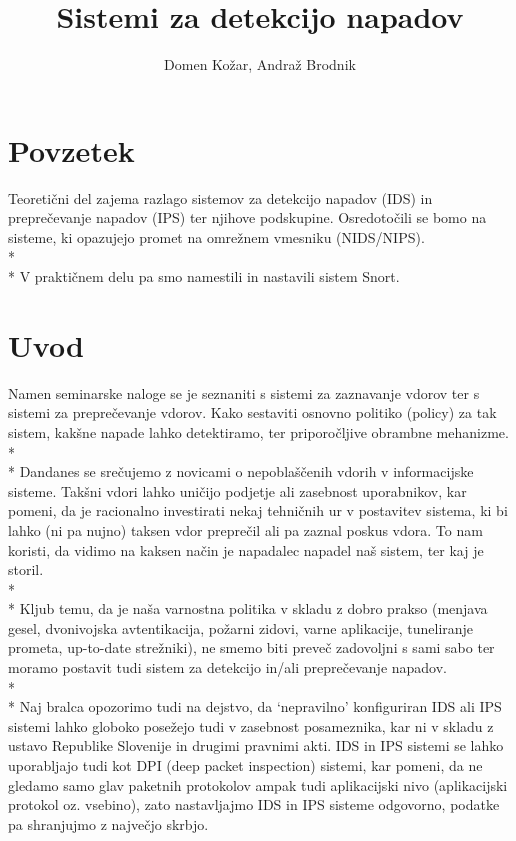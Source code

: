 \documentclass[12pt]{article}
\title{Sistemi za detekcijo napadov}
\author{Domen Kožar, Andraž Brodnik}
\let\stdsection\section
\renewcommand\section{\newpage\stdsection}
\begin{document}
\maketitle

\tableofcontents

\section{Povzetek}
Teoretični del zajema razlago sistemov za detekcijo napadov (IDS) in preprečevanje napadov (IPS) 
ter njihove podskupine. 
Osredotočili se bomo na sisteme, ki opazujejo promet na omrežnem vmesniku (NIDS/NIPS).
\\*
\\*
V praktičnem delu pa smo namestili in nastavili sistem Snort.

\section{Uvod}

Namen seminarske naloge se je seznaniti s sistemi za zaznavanje vdorov ter s sistemi za preprečevanje vdorov. 
Kako sestaviti osnovno politiko (policy) za tak sistem, kakšne napade lahko detektiramo, ter priporočljive obrambne mehanizme.
\\*
\\*
Dandanes se srečujemo z novicami o nepoblaščenih vdorih v informacijske sisteme.
Takšni vdori lahko uničijo podjetje ali zasebnost uporabnikov,
kar pomeni, da je racionalno investirati nekaj tehničnih ur v postavitev sistema, ki bi lahko (ni pa nujno) taksen vdor preprečil ali pa zaznal poskus vdora.
To nam koristi, da vidimo na kaksen način je napadalec napadel naš sistem, ter kaj je storil. 
\\*
\\*
Kljub temu, da je naša varnostna politika v skladu z dobro prakso (menjava gesel, dvonivojska avtentikacija, požarni zidovi,
varne aplikacije, tuneliranje prometa, up-to-date strežniki), ne smemo biti preveč zadovoljni s sami sabo ter moramo postavit tudi sistem za detekcijo in/ali preprečevanje napadov.
\\*
\\*
Naj bralca opozorimo tudi na dejstvo, da `nepravilno' konfiguriran IDS ali IPS sistemi lahko globoko posežejo
tudi v zasebnost posameznika, kar ni v skladu z ustavo Republike Slovenije in drugimi pravnimi akti.
IDS in IPS sistemi se lahko uporabljajo tudi kot DPI (deep packet inspection) sistemi, kar pomeni, da ne gledamo
samo glav paketnih protokolov ampak tudi aplikacijski nivo (aplikacijski protokol oz. vsebino), 
zato nastavljajmo IDS in IPS sisteme odgovorno, podatke pa shranjujmo z največjo skrbjo.
\end{document}
